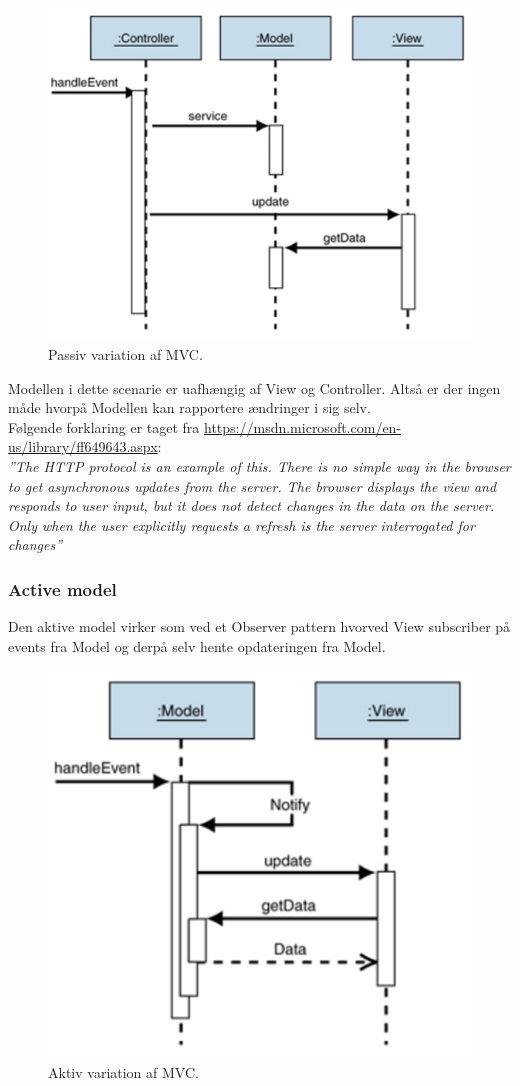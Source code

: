 \begin{figure}[H]
	\centering
	\includegraphics[width=0.6\linewidth]{figs/MVC/mvc_passive}
	\caption{Passiv variation af MVC.}
	\label{fig:mvc_passive}
\end{figure}

Modellen i dette scenarie er uafhængig af View og Controller. Altså er der ingen måde hvorpå Modellen kan rapportere ændringer i sig selv.\\

Følgende forklaring er taget fra \url{https://msdn.microsoft.com/en-us/library/ff649643.aspx}:\\

\textit{''The HTTP protocol is an example of this. There is no simple way in the browser to get asynchronous updates from the server. The browser displays the view and responds to user input, but it does not detect changes in the data on the server. Only when the user explicitly requests a refresh is the server interrogated for changes''}

\subsubsection{Active model}
Den aktive model virker som ved et Observer pattern hvorved View subscriber på events fra Model og derpå selv hente opdateringen fra Model.

\begin{figure}[H]
	\centering
	\includegraphics[width=0.6\linewidth]{figs/MVC/mvc_active}
	\caption{Aktiv variation af MVC.}
	\label{fig:mvc_active}
\end{figure}

